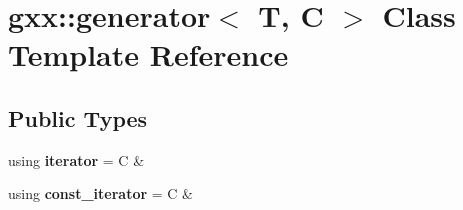 \hypertarget{classgxx_1_1generator}{}\section{gxx\+:\+:generator$<$ T, C $>$ Class Template Reference}
\label{classgxx_1_1generator}
\subsection*{Public Types}
\begin{DoxyCompactItemize}
\item 
using {\bfseries iterator} = C \&\hypertarget{classgxx_1_1generator_a164dfcf8955308bea224493df9a4a350}{}\label{classgxx_1_1generator_a164dfcf8955308bea224493df9a4a350}

\item 
using {\bfseries const\+\_\+iterator} = C \&\hypertarget{classgxx_1_1generator_abf7c304efead324b93e0c32c661a5a7b}{}\label{classgxx_1_1generator_abf7c304efead324b93e0c32c661a5a7b}

\end{DoxyCompactItemize}
